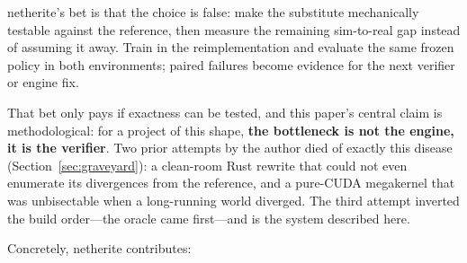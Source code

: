 \documentclass[11pt]{article}
\begin{document}
netherite's bet is that the choice is false: make the substitute mechanically testable against the reference, then measure the remaining sim-to-real gap instead of assuming it away. Train in the reimplementation and evaluate the same frozen policy in both environments; paired failures become evidence for the next verifier or engine fix.

That bet only pays if exactness can be tested, and this paper's central claim is methodological: for a project of this shape, \textbf{the bottleneck is not the engine, it is the verifier}. Two prior attempts by the author died of exactly this disease (Section~\ref{sec:graveyard}): a clean-room Rust rewrite that could not even enumerate its divergences from the reference, and a pure-CUDA megakernel that was unbisectable when a long-running world diverged. The third attempt inverted the build order---the oracle came first---and is the system described here.

Concretely, netherite contributes:
\end{document}
